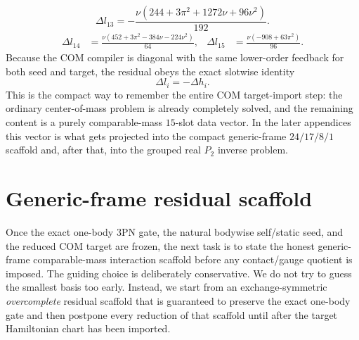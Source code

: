 \documentclass[11pt]{article}
\begin{document}
\begin{equation}
 \Delta l_{13}=-\frac{\nu(244+3\pi^2+1272\nu+96\nu^2)}{192}.
\label{eq:app-gr-com-target-delta-l-13}
\end{equation}
\begin{equation}
\begin{aligned}
 \Delta l_{14}&=\frac{\nu(452+3\pi^2-384\nu-224\nu^2)}{64},
 & \Delta l_{15}&=\frac{\nu(-908+63\pi^2)}{96}.
\end{aligned}
\label{eq:app-gr-com-target-delta-l-14-15}
\end{equation}
Because the COM compiler is diagonal with the same lower-order feedback for both
seed and target, the residual obeys the exact slotwise identity
\begin{equation}
 \Delta l_i=-\Delta h_i.
\label{eq:app-gr-com-target-delta-l-equals-minus-delta-h}
\end{equation}
This is the compact way to remember the entire COM target-import step: the
ordinary center-of-mass problem is already completely solved, and the remaining
content is a purely comparable-mass $15$-slot data vector. In the later
appendices this vector is what gets projected into the compact generic-frame
$24/17/8/1$ scaffold and, after that, into the grouped real $P_2$ inverse
problem.


\section{Generic-frame residual scaffold}
\label{app:generic-scaffold}

Once the exact one-body $3$PN gate, the natural bodywise self/static seed, and
 the reduced COM target are frozen, the next task is to state the honest
 generic-frame comparable-mass interaction scaffold before any contact/gauge
 quotient is imposed.  The guiding choice is deliberately conservative.  We do
 not try to guess the smallest basis too early.  Instead, we start from an
 exchange-symmetric \emph{overcomplete} residual scaffold that is guaranteed to
 preserve the exact one-body gate and then postpone every reduction of that
 scaffold until after the target Hamiltonian chart has been imported.
\end{document}
